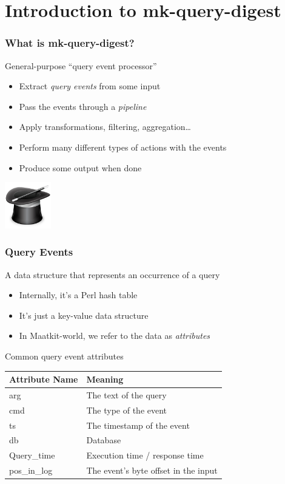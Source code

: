 \section{Introduction to mk-query-digest}

\begin{frame}
   \frametitle{What is mk-query-digest?}
   \begin{block}{General-purpose ``query event processor''}
      \begin{itemize}
         \item Extract \emph{query events} from some input
         \item Pass the events through a \emph{pipeline}
         \item Apply transformations, filtering, aggregation\dots
         \item Perform many different types of actions with the events
         \item Produce some output when done
      \end{itemize}
   \end{block}
   \includegraphics[width=20mm]{../image/wizard}
\end{frame}

\begin{frame}
   \frametitle{Query Events}
   \begin{block}{A data structure that represents an occurrence of a query}
      \begin{itemize}
         \item Internally, it's a Perl hash table
         \item It's just a key-value data structure
         \item In Maatkit-world, we refer to the data as \emph{attributes}
      \end{itemize}
   \end{block}
   \begin{block}{Common query event attributes}
      \begin{center}
      \begin{tabular}{ll}
         Attribute Name & Meaning \\
         \hline
         arg         & The text of the query \\
         cmd         & The type of the event \\
         ts          & The timestamp of the event \\
         db          & Database \\
         Query\_time & Execution time / response time \\
         pos\_in\_log & The event's byte offset in the input \\
      \end{tabular}
      \end{center}
   \end{block}
\end{frame}

